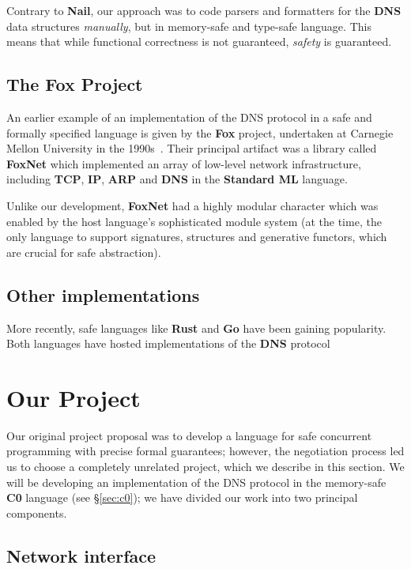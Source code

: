 \documentclass{article}
\newcommand\Kwd[1]{{\sffamily\bfseries{#1}}}
\begin{document}
Contrary to \Kwd{Nail}, our approach was to code parsers and
formatters for the \Kwd{DNS} data structures \emph{manually}, but in
memory-safe and type-safe language. This means that while functional
correctness is not guaranteed, \emph{safety} is guaranteed.


\subsection*{The \Kwd{Fox} Project}
An earlier example of an implementation of the DNS protocol in a safe
and formally specified language is given by the \Kwd{Fox} project,
undertaken at Carnegie Mellon University in the
1990s~\citep{biagioni-harper-lee-milnes:1994,
  biagioni-harper-lee:2001}. Their principal artifact was a library
called \Kwd{FoxNet} which implemented an array of low-level network
infrastructure, including \Kwd{TCP}, \Kwd{IP}, \Kwd{ARP} and \Kwd{DNS}
in the \Kwd{Standard ML} language.

Unlike our development, \Kwd{FoxNet} had a highly modular character
which was enabled by the host language's sophisticated module system
(at the time, the only language to support signatures, structures and
generative functors, which are crucial for safe abstraction).


\subsection*{Other implementations}

More recently, safe languages
like \Kwd{Rust} and \Kwd{Go} have been gaining popularity. Both
languages have hosted implementations of the \Kwd{DNS}
protocol~\citep{github:trust-dns,github:miekg-dns}


\section{Our Project}\label{sec:our-project}

Our original project proposal was to develop a language for safe
concurrent programming with precise formal guarantees; however, the
negotiation process led us to choose a completely unrelated project,
which we describe in this section. We will be developing an
implementation of the DNS protocol in the memory-safe \Kwd{C0}
language (see \S\ref{sec:c0}); we have divided our work into two
principal components.

\subsection{Network interface}\label{sec:network-interface}
\end{document}
